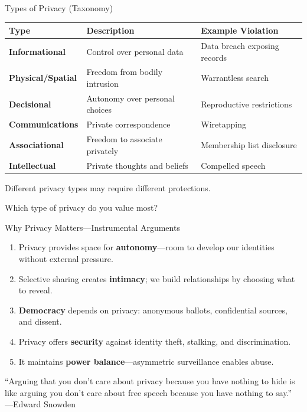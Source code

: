 ﻿\documentclass[aspectratio=169,11pt]{beamer}
\begin{document}
\begin{frame}{Types of Privacy (Taxonomy)}
\begin{table}[h]
\centering
\scriptsize
\begin{tabular}{@{}llp{4cm}@{}}
\toprule
\textbf{Type} & \textbf{Description} & \textbf{Example Violation} \\
\midrule
\textbf{Informational} & Control over personal data & Data breach exposing records \\
\textbf{Physical/Spatial} & Freedom from bodily intrusion & Warrantless search \\
\textbf{Decisional} & Autonomy over personal choices & Reproductive restrictions \\
\textbf{Communications} & Private correspondence & Wiretapping \\
\textbf{Associational} & Freedom to associate privately & Membership list disclosure \\
\textbf{Intellectual} & Private thoughts and beliefs & Compelled speech \\
\bottomrule
\end{tabular}
\end{table}

\vspace{0.2em}
Different privacy types may require different protections.

\begin{discussionbox}[Discussion]
Which type of privacy do you value most?
\end{discussionbox}
\end{frame}

\begin{frame}{Why Privacy Matters---Instrumental Arguments}
\begin{probox}
\scriptsize
\begin{enumerate}
    \item Privacy provides space for \textbf{autonomy}---room to develop our identities without external pressure.
    \item Selective sharing creates \textbf{intimacy}; we build relationships by choosing what to reveal.
    \item \textbf{Democracy} depends on privacy: anonymous ballots, confidential sources, and dissent.
    \item Privacy offers \textbf{security} against identity theft, stalking, and discrimination.
    \item It maintains \textbf{power balance}---asymmetric surveillance enables abuse.
\end{enumerate}
\end{probox}

\begin{quotebox}
\small
``Arguing that you don't care about privacy because you have nothing to hide is like arguing you don't care about free speech because you have nothing to say.'' \hfill---Edward Snowden
\end{quotebox}
\end{frame}
\end{document}
